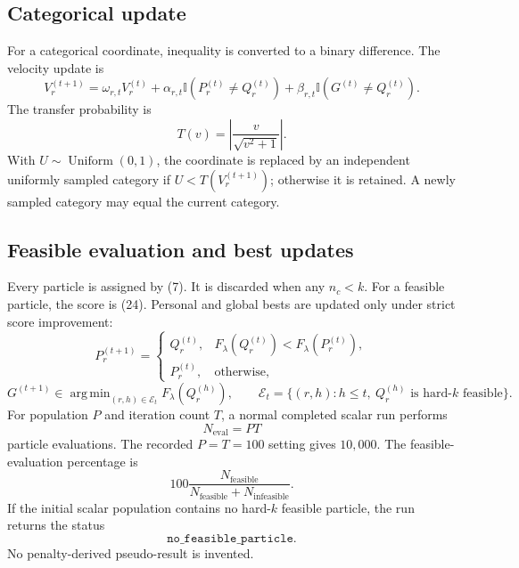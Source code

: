 \documentclass[11pt,a4paper]{article}
\newcommand{\I}{\mathbb{I}}
\newcommand{\code}[1]{\texttt{#1}}
\DeclareMathOperator*{\argmin}{arg\,min}
\begin{document}
\subsection{Categorical update}

For a categorical coordinate, inequality is converted to a binary difference.
The velocity update is
\begin{equation}
V_{r}^{(t+1)}=
\omega_{r,t}V_r^{(t)}
+\alpha_{r,t}\I(P_r^{(t)}\ne Q_r^{(t)})
+\beta_{r,t}\I(G^{(t)}\ne Q_r^{(t)}).
\tag{42}
\end{equation}
The transfer probability is
\begin{equation}
T(v)=\left|\frac{v}{\sqrt{v^2+1}}\right|.
\tag{43}
\end{equation}
With $U\sim\operatorname{Uniform}(0,1)$, the coordinate is replaced by an
independent uniformly sampled category if $U<T(V_r^{(t+1)})$; otherwise it is
retained.  A newly sampled category may equal the current category.

\subsection{Feasible evaluation and best updates}

Every particle is assigned by (7).  It is discarded when any $n_c<k$.
For a feasible particle, the score is (24).  Personal and global bests are
updated only under strict score improvement:
\[
P_r^{(t+1)}=
\begin{cases}
Q_r^{(t)},&F_\lambda(Q_r^{(t)})<F_\lambda(P_r^{(t)}),\\
P_r^{(t)},&\text{otherwise},
\end{cases}
\tag{44}
\]
\[
G^{(t+1)}\in\argmin_{(r,h)\in\mathcal E_t}F_\lambda(Q_r^{(h)}),
\qquad
\mathcal E_t=\{(r,h):h\le t,\ Q_r^{(h)}\text{ is hard-$k$ feasible}\}.
\tag{45}
\]
For population $P$ and iteration count $T$, a normal completed scalar run
performs
\begin{equation}
N_{\mathrm{eval}}=PT
\tag{46}
\end{equation}
particle evaluations.  The recorded $P=T=100$ setting gives $10{,}000$.
The feasible-evaluation percentage is
\begin{equation}
100\frac{N_{\mathrm{feasible}}}
{N_{\mathrm{feasible}}+N_{\mathrm{infeasible}}}.
\tag{47}
\end{equation}
If the initial scalar population contains no hard-$k$ feasible particle, the
run returns the status
\[
\code{no\_feasible\_particle}.
\]
No penalty-derived pseudo-result is invented.
\end{document}
